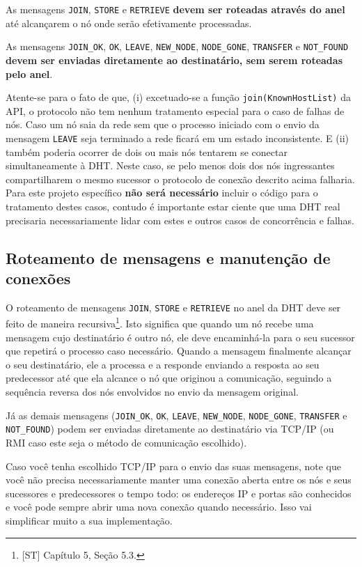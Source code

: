 \documentclass[oneside,12pt,a4paper]{article}
\begin{document}
As mensagens \texttt{JOIN}, \texttt{STORE} e \texttt{RETRIEVE}
\textbf{devem ser roteadas através do anel} até alcançarem o nó onde
serão efetivamente processadas.

As mensagens \texttt{JOIN\_OK}, \texttt{OK}, \texttt{LEAVE},
\texttt{NEW\_NODE}, \texttt{NODE\_GONE}, \texttt{TRANSFER} e
\texttt{NOT\_FOUND} \textbf{devem ser enviadas diretamente ao
  destinatário, sem serem roteadas pelo anel}.

Atente-se para o fato de que, (i) excetuado-se a função
\texttt{join(KnownHostList)} da API, o protocolo não tem nenhum
tratamento especial para o caso de falhas de nós. Caso um nó saia da
rede sem que o processo iniciado com o envio da mensagem
\texttt{LEAVE} seja terminado a rede ficará em um estado
inconsistente. E (ii) também poderia ocorrer de dois ou mais nós
tentarem se conectar simultaneamente à DHT. Neste caso, se pelo menos
dois dos nós ingressantes compartilharem o mesmo sucessor o protocolo
de conexão descrito acima falharia. Para este projeto específico
\textbf{não será necessário} incluir o código para o tratamento destes
casos, contudo é importante estar ciente que uma DHT real precisaria
necessariamente lidar com estes e outros casos de concorrência e
falhas.

\subsection{Roteamento de mensagens e manutenção de conexões}

O roteamento de mensagens \texttt{JOIN}, \texttt{STORE} e
\texttt{RETRIEVE} no anel da DHT deve ser feito de maneira
recursiva\footnote{[ST] Capítulo 5, Seção 5.3.}. Isto significa que
quando um nó recebe uma mensagem cujo destinatário é outro nó, ele
deve encaminhá-la para o seu sucessor que repetirá o processo caso
necessário. Quando a mensagem finalmente alcançar o seu destinatário,
ele a processa e a responde enviando a resposta ao seu predecessor
até que ela alcance o nó que originou a comunicação, seguindo a
sequência reversa dos nós envolvidos no envio da mensagem original.

Já as demais mensagens (\texttt{JOIN\_OK}, \texttt{OK}, \texttt{LEAVE},
\texttt{NEW\_NODE}, \texttt{NODE\_GONE}, \texttt{TRANSFER} e
\texttt{NOT\_FOUND}) podem ser enviadas diretamente ao destinatário via
TCP/IP (ou RMI caso este seja o método de comunicação escolhido).

Caso você tenha escolhido TCP/IP para o envio das suas mensagens, note
que você não precisa necessariamente manter uma conexão aberta entre
os nós e seus sucessores e predecessores o tempo todo: os endereços IP
e portas são conhecidos e você pode sempre abrir uma nova conexão
quando necessário. Isso vai simplificar muito a sua implementação.
\end{document}
